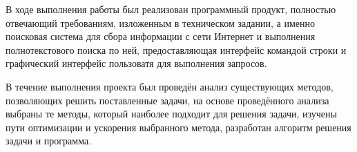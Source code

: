 \Conclusion

В ходе выполнения работы был реализован программный продукт, полностью отвечающий требованиям, изложенным в техническом задании, а именно поисковая система для сбора информации с сети Интернет и выполнения полнотекстового поиска по ней, предоставляющая интерфейс командой строки и графический интерфейс пользоватя для выполнения запросов.

В течение выполнения проекта был проведён анализ существующих методов, позволяющих решить поставленные задачи, на основе проведённого анализа выбраны те методы, который наиболее подходит для решения задачи, изучены пути оптимизации и ускорения выбранного метода, разработан алгоритм решения задачи и программа.
